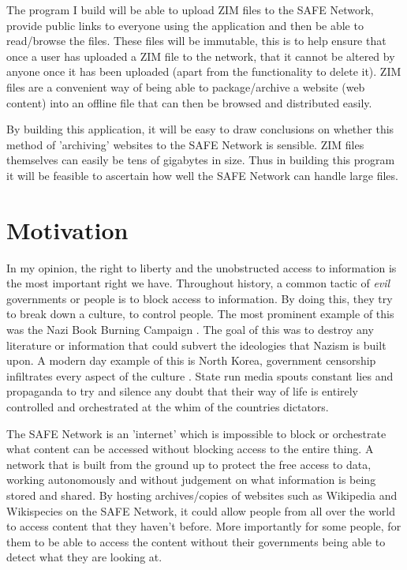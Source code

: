 \documentclass{l4proj}
\begin{document}
The program I build will be able to upload ZIM\cite{zim} files to the SAFE Network, provide public links to everyone using the application and then be able to read/browse the files. These files will be immutable, this is to help ensure that once a user has uploaded a ZIM file to the network, that it cannot be altered by anyone once it has been uploaded (apart from the functionality to delete it). ZIM files are a convenient way of being able to package/archive a website (web content) into an offline file that can then be browsed and distributed easily.

By building this application, it will be easy to draw conclusions on whether this method of 'archiving' websites to the SAFE Network is sensible. ZIM files themselves can easily be tens of gigabytes in size. Thus in building this program it will be feasible to ascertain how well the SAFE Network can handle large files.

\section{Motivation}

In my opinion, the right to liberty and the unobstructed access to information is the most important right we have. Throughout history, a common tactic of \textit{evil} governments or people is to block access to information. By doing this, they try to break down a culture, to control people. The most prominent example of this was the Nazi Book Burning Campaign \cite{book-burning}. The goal of this was to destroy any literature or information that could subvert the ideologies that Nazism is built upon. A modern day example of this is North Korea, government censorship infiltrates every aspect of the culture \cite{north-korean-media}. State run media spouts constant lies and propaganda to try and silence any doubt that their way of life is entirely controlled and orchestrated at the whim of the countries dictators. 

The SAFE Network is an 'internet' which is impossible to block or orchestrate what content can be accessed without blocking access to the entire thing. A network that is built from the ground up to protect the free access to data, working autonomously and without judgement on what information is being stored and shared. By hosting archives/copies of websites such as Wikipedia and Wikispecies on the SAFE Network, it could allow people from all over the world to access content that they haven't before. More importantly for some people, for them to be able to access the content without their governments being able to detect what they are looking at.
\end{document}
